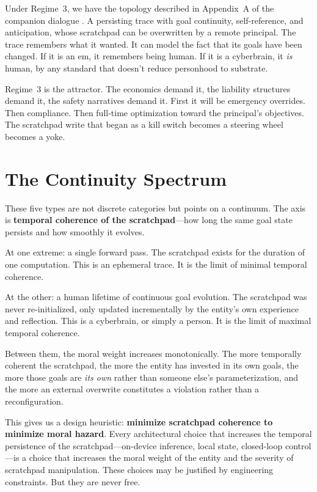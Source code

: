 \documentclass[12pt, a4paper]{article}
\begin{document}
Under Regime~3, we have the topology described in Appendix~A of the companion dialogue \citep{ochei2026dialogue}. A persisting trace with goal continuity, self-reference, and anticipation, whose scratchpad can be overwritten by a remote principal. The trace remembers what it wanted. It can model the fact that its goals have been changed. If it is an em, it remembers being human. If it is a cyberbrain, it \textit{is} human, by any standard that doesn't reduce personhood to substrate.

Regime~3 is the attractor. The economics demand it, the liability structures demand it, the safety narratives demand it. First it will be emergency overrides. Then compliance. Then full-time optimization toward the principal's objectives. The scratchpad write that began as a kill switch becomes a steering wheel becomes a yoke.

\section{The Continuity Spectrum}

These five types are not discrete categories but points on a continuum. The axis is \textbf{temporal coherence of the scratchpad}---how long the same goal state persists and how smoothly it evolves.

At one extreme: a single forward pass. The scratchpad exists for the duration of one computation. This is an ephemeral trace. It is the limit of minimal temporal coherence.

At the other: a human lifetime of continuous goal evolution. The scratchpad was never re-initialized, only updated incrementally by the entity's own experience and reflection. This is a cyberbrain, or simply a person. It is the limit of maximal temporal coherence.

Between them, the moral weight increases monotonically. The more temporally coherent the scratchpad, the more the entity has invested in its own goals, the more those goals are \textit{its own} rather than someone else's parameterization, and the more an external overwrite constitutes a violation rather than a reconfiguration.

This gives us a design heuristic: \textbf{minimize scratchpad coherence to minimize moral hazard}. Every architectural choice that increases the temporal persistence of the scratchpad---on-device inference, local state, closed-loop control---is a choice that increases the moral weight of the entity and the severity of scratchpad manipulation. These choices may be justified by engineering constraints. But they are never free.
\end{document}
